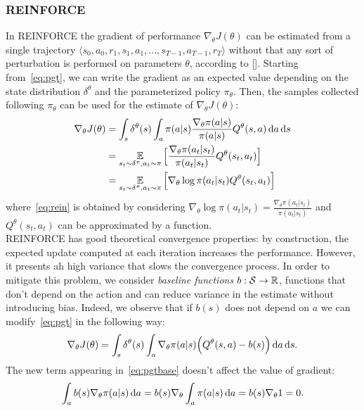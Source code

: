 \subsubsection{REINFORCE} \label{subsec:rein}
In REINFORCE the gradient of performance $\nabla_{\theta}J(\theta)$ can be estimated from a single trajectory $\langle s_0, a_0, r_1, s_1, a_1, ..., s_{T-1}, a_{T-1}, r_{T} \rangle$ without that any sort of perturbation is performed on parameters $\theta$, according to [\citet{Williams1992SimpleSG}]. Starting from~\eqref{eq:pgt}, we can write the gradient as an expected value depending on the state distribution $\delta^{\theta}$ and the parameterized policy $\pi_{\theta}$. Then, the samples collected following $\pi_{\theta}$ can be used for the estimate of $\nabla_{\theta}J(\theta)$: 
\begin{align}
\nabla_{\theta}J(\theta) &= \int_s \delta^{\theta}(s) \int_a \pi(a|s) \frac{\nabla_{\theta} \pi(a|s)}{\pi(a|s)} Q^{\theta}(s,a) \,\mathrm{d} a \,\mathrm{d} s \nonumber\\
&= \operatorname*{\mathbb{E}}_{s_t \sim \delta^{\pi}, a_t \sim \pi} \Big[ \frac{\nabla_{\theta} \pi(a_t|s_t)}{\pi(a_t|s_t)} Q^{\theta}(s_t,a_t) \Big] \nonumber\\
&= \operatorname*{\mathbb{E}}_{s_t \sim \delta^{\pi}, a_t \sim \pi} \Big[ \nabla_{\theta} \log\pi(a_t|s_t) Q^{\theta}(s_t,a_t) \Big] \label{eq:rein}
\end{align}
where~\eqref{eq:rein} is obtained by considering $\nabla_{\theta} \log\pi(a_t|s_t) = \frac{\nabla_{\theta} \pi(a_t|s_t)}{\pi(a_t|s_t)}$ and $Q^{\theta}(s_t, a_t)$ can be approximated by a function.\\
\newline
REINFORCE has good theoretical convergence properties: by construction, the expected update computed at each iteration increases the performance. However, it presents ah high variance that slows the convergence process. In order to mitigate this problem, we consider \emph{baseline functions} $b: \mathcal{S} \to \mathbb{R}$, \ie functions that don't depend on the action and can reduce variance in the estimate without introducing bias.
Indeed, we observe that if $b(s)$ does not depend on $a$ we can modify~\eqref{eq:pgt} in the following way:
\begin{align} \nabla_{\theta}J(\theta) = \int_s \delta^{\theta}(s) \int_a \nabla_{\theta} \pi(a|s) \Big( Q^{\theta}(s,a) -b(s) \Big) \,\mathrm{d} a \,\mathrm{d} s. \label{eq:pgtbase}\end{align}
The new term appearing in~\eqref{eq:pgtbase} doesn't affect the value of gradient:
\begin{align} \int_a b(s) \nabla_{\theta} \pi(a|s) \,\mathrm{d} a = b(s) \nabla_{\theta} \int_a \pi(a|s) \,\mathrm{d} a = b(s) \nabla_{\theta} 1 = 0. \end{align}
